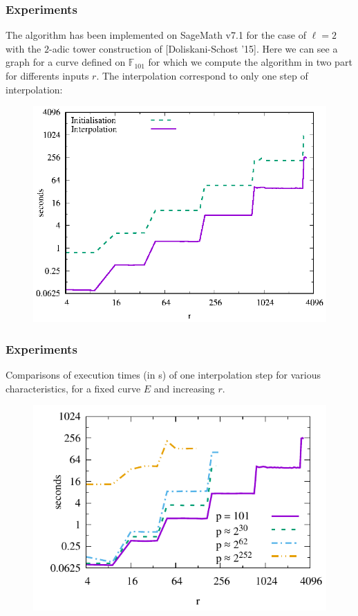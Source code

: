 \documentclass[10pt,a4paper]{beamer}
\theoremstyle{plain}
\theoremstyle{definition}
\theoremstyle{definition}
\theoremstyle{definition}
\theoremstyle{definition}
\theoremstyle{remark}
\theoremstyle{remark}
\begin{document}
\begin{frame}
\frametitle{Experiments}
The algorithm has been implemented on SageMath v7.1 for the case of $\ell=2$ with the $2$-adic tower construction of [Doliskani-Schost '15].%
Here we can see a graph for a curve defined on $\mathbb{F}_{101}$ for which we compute the algorithm in two part for differents  inputs $r$. The interpolation correspond to only one step of interpolation:
\begin{figure}[hbtp]
\centering
\includegraphics[scale=0.7]{Images/graphe-101-bis.eps}
\end{figure}
\end{frame}


\begin{frame}
\frametitle{Experiments}
Comparisons of execution times (in s) of one interpolation step for various characteristics, for a fixed curve $E$ and increasing $r$.
\begin{figure}[hbtp]
\centering
\includegraphics[scale=0.8]{Images/graphe-101-149-269.pdf}
\end{figure}
\end{frame}
\end{document}
